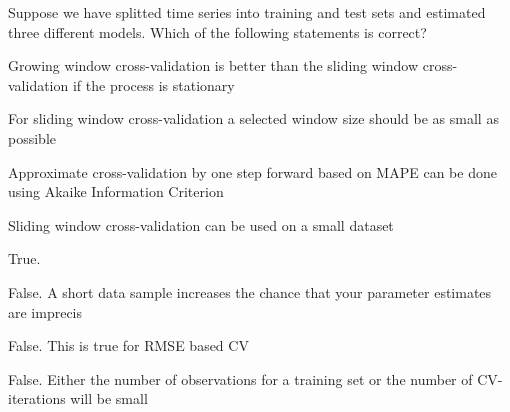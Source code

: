 
\begin{question}
Suppose we have splitted time series into training and test sets and estimated three different models. Which of the following statements is correct?
\begin{answerlist}
  \item Growing window cross-validation is better than the sliding window cross-validation if the process is stationary
  \item For sliding window cross-validation a selected window size should be as small as possible
  \item Approximate cross-validation by one step forward based on MAPE can be done using Akaike Information Criterion
  \item Sliding window cross-validation can be used on a small dataset
\end{answerlist}
\end{question}

\begin{solution}
\begin{answerlist}
  \item True.
  \item False. A short data sample increases the chance that your parameter estimates are imprecis
  \item False. This is true for RMSE based CV
  \item False. Either the number of observations for a training set or the number of CV-iterations will be small
\end{answerlist}
\end{solution}

